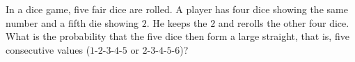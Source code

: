 In a dice game, five fair dice are rolled. A player has four dice showing the same number and a fifth die showing $2$. He keeps the $2$ and rerolls the other four dice. What is the probability that the five dice then form a large straight, that is, five consecutive values ($1$-$2$-$3$-$4$-$5$ or $2$-$3$-$4$-$5$-$6$)?
